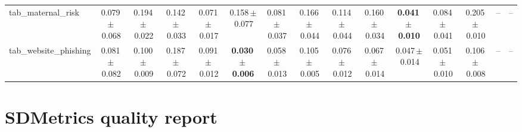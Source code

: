 \documentclass[8pt]{extarticle}
\begin{document}
\begin{longtable}{l*{14}{c}}
tab\_maternal\_risk & 0.079\,$\pm$\,0.068 & 0.194\,$\pm$\,0.022 & 0.142\,$\pm$\,0.033 & 0.071\,$\pm$\,0.017 & 0.158\,$\pm$\,0.077 & 0.081\,$\pm$\,0.037 & 0.166\,$\pm$\,0.044 & 0.114\,$\pm$\,0.044 & 0.160\,$\pm$\,0.034 & \textbf{0.041\,$\pm$\,0.010} & 0.084\,$\pm$\,0.041 & 0.205\,$\pm$\,0.010 & -- & -- \\
tab\_website\_phishing & 0.081\,$\pm$\,0.082 & 0.100\,$\pm$\,0.009 & 0.187\,$\pm$\,0.072 & 0.091\,$\pm$\,0.012 & \textbf{0.030\,$\pm$\,0.006} & 0.058\,$\pm$\,0.013 & 0.105\,$\pm$\,0.005 & 0.076\,$\pm$\,0.012 & 0.067\,$\pm$\,0.014 & 0.047\,$\pm$\,0.014 & 0.051\,$\pm$\,0.010 & 0.106\,$\pm$\,0.008 & -- & -- \\
\end{longtable}

\section*{SDMetrics quality report}
\end{document}
